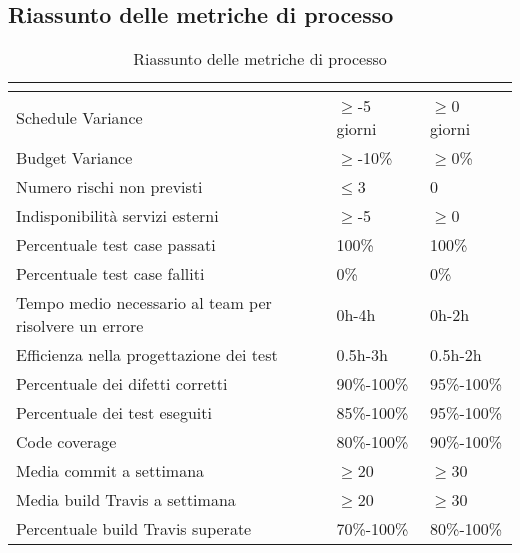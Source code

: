 \subsection{Riassunto delle metriche di processo}
\renewcommand{\arraystretch}{1.5}
\begin{table}[H]
	\centering
	\begin{tabular}{|C{5cm}|C{4cm}|C{4cm}|}
		\hline
		\textbf{\color{title_text}{Nome Metrica}} &  \textbf{\color{title_text}{Range accettabile}} & \textbf{\color{title_text}{Range ottimale}} \\ \hline
		Schedule Variance & $\geq$-5 giorni  & $\geq$0 giorni \\ \hline
		Budget Variance&$\geq$-10\% &$\geq$0\% \\ \hline
		Numero rischi non previsti&$\leq$3 & 0 \\ \hline
		Indisponibilità servizi esterni&$\geq$-5 &$\geq$0 \\ \hline
		Percentuale test case passati & 100\%  & 100\% \\ \hline
		Percentuale test case falliti & 0\% & 0\% \\ \hline
		Tempo medio necessario al team per risolvere un errore & 0h-4h & 0h-2h \\ \hline
		Efficienza nella progettazione dei test & 0.5h-3h & 0.5h-2h \\ \hline
		Percentuale dei difetti corretti & 90\%-100\% & 95\%-100\% \\ \hline
		Percentuale dei test eseguiti & 85\%-100\% & 95\%-100\% \\ \hline
		Code coverage & 80\%-100\% & 90\%-100\% \\ \hline
		Media commit a settimana&$\geq$20 &$\geq$30 \\ \hline
		Media build Travis a settimana&$\geq$20 &$\geq$30 \\ \hline
		Percentuale build Travis superate& 70\%-100\% & 80\%-100\% \\ \hline
	\end{tabular}
	\caption{Riassunto delle metriche di processo}
	\label{tabella:riassunto metriche di processo}
\end{table}
\renewcommand{\arraystretch}{1}

\pagebreak
